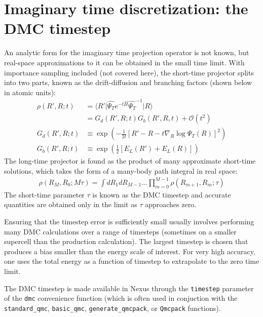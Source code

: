 \documentclass[oneside,11pt]{memoir}
\numberwithin{equation}{section}
\newcommand{\ket}[1]{\lvert #1 \rangle}
\newcommand{\bra}[1]{\langle #1 \rvert}
\newcommand{\expvalnh}[3]{\bra{#1}#2\ket{#3}}
\begin{document}
\section{Imaginary time discretization: the DMC timestep}
An analytic form for the imaginary time projection operator is not known, but 
real-space approximations to it can be obtained in the small time limit.  
With importance sampling included (not covered here), the short-time projector 
splits into two parts, known as the drift-diffusion and branching factors 
(shown below in atomic units):
\begin{align}
   \rho(R',R;t)  &= \expvalnh{R'}{\hat{\Psi_T}e^{-t\hat{H}}\hat{\Psi_T}^{-1}}{R}\\ 
    &= G_d(R',R;t)G_b(R',R,t) +\mathcal{O}(t^2) \\
  G_d(R',R;t) &\equiv \exp{\left(-\tfrac{1}{2t}\left[R'-R-t\nabla_R\log\Psi_T(R)\right]^2\right)} \\
  G_b(R',R;t) &\equiv \exp{\left(\tfrac{1}{2}\left[E_L(R')+E_L(R)\right]\right)}
\end{align}
The long-time projector is found as the product of many approximate short-time 
solutions, which takes the form of a many-body path integral in real space:
\begin{align}
  \rho(R_M,R_0; M\tau) = \int dR_1dR_{M-1}\ldots \prod_{m=0}^{M-1}\rho(R_{m+1},R_m;\tau)
\end{align}
The short-time parameter $\tau$ is known as the DMC timestep and accurate 
quantities are obtained only in the limit as $\tau$ approaches zero.

Ensuring that the timestep error is sufficiently small usually involves 
performing many DMC calculations over a range of timesteps (sometimes on 
a smaller supercell than the production calculation).  The largest timestep 
is chosen that produces a bias smaller than the energy scale of interest.  
For very high accuracy, one uses the total energy as a function of timestep to 
extrapolate to the zero time limit.

The DMC timestep is made available in Nexus through the 
\texttt{timestep} parameter of the \texttt{dmc} convenience function 
(which is often used in conjuction with the \texttt{standard\_qmc},  
\texttt{basic\_qmc}, \texttt{generate\_qmcpack}, or \texttt{Qmcpack} 
functions). 
\end{document}
